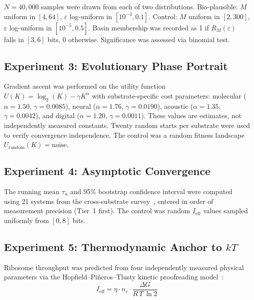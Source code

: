 \documentclass[12pt,a4paper]{article}
\begin{document}
$N = 40{,}000$ samples were drawn from each of two distributions. Bio-plausible: $M$ uniform in $[4, 64]$, $\varepsilon$ log-uniform in $[10^{-4}, 0.1]$. Control: $M$ uniform in $[2, 300]$, $\varepsilon$ log-uniform in $[10^{-5}, 0.5]$. Basin membership was recorded as 1 if $R_M(\varepsilon)$ falls in $[3, 6]$ bits, 0 otherwise. Significance was assessed via binomial test.

\subsection{Experiment 3: Evolutionary Phase Portrait}

Gradient ascent was performed on the utility function $U(K) = \log_2(K) - \gamma K^{\alpha}$ with substrate-specific cost parameters: molecular ($\alpha = 1.50$, $\gamma = 0.0085$), neural ($\alpha = 1.76$, $\gamma = 0.0190$), acoustic ($\alpha = 1.35$, $\gamma = 0.0042$), and digital ($\alpha = 1.20$, $\gamma = 0.0011$). These values are estimates, not independently measured constants. Twenty random starts per substrate were used to verify convergence independence. The control was a random fitness landscape $U_{\mathrm{random}}(K) = \text{noise}$.

\subsection{Experiment 4: Asymptotic Convergence}

The running mean $\tau_n$ and 95\% bootstrap confidence interval were computed using 21 systems from the cross-substrate survey~\cite{whitmer2026basin}, entered in order of measurement precision (Tier~1 first). The control was random $I_{\mathrm{eff}}$ values sampled uniformly from $[0, 8]$ bits.

\subsection{Experiment 5: Thermodynamic Anchor to $kT$}

Ribosome throughput was predicted from four independently measured physical parameters via the Hopfield--Pi\~neros--Tlusty kinetic proofreading model~\cite{hopfield1974,pineros2020}:
\begin{equation}
I_{\mathrm{eff}} = \eta \cdot n_c \cdot \frac{\Delta G}{R\,T\,\ln 2}
\end{equation}
\end{document}
